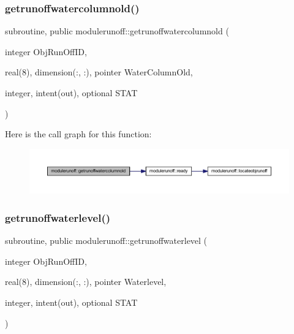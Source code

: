 \subsubsection{\texorpdfstring{getrunoffwatercolumnold()}{getrunoffwatercolumnold()}}
{\footnotesize\ttfamily subroutine, public modulerunoff\+::getrunoffwatercolumnold (\begin{DoxyParamCaption}\item[{integer}]{Obj\+Run\+Off\+ID,  }\item[{real(8), dimension(\+:, \+:), pointer}]{Water\+Column\+Old,  }\item[{integer, intent(out), optional}]{S\+T\+AT }\end{DoxyParamCaption})}

Here is the call graph for this function\+:
\nopagebreak
\begin{figure}[H]
\begin{center}
\leavevmode
\includegraphics[width=350pt]{namespacemodulerunoff_a4718c4b469bb2480c20b88afa22ebc29_cgraph}
\end{center}
\end{figure}
\mbox{\label{namespacemodulerunoff_a739d861fb3d51996841a644f1567506e}} 
\subsubsection{\texorpdfstring{getrunoffwaterlevel()}{getrunoffwaterlevel()}}
{\footnotesize\ttfamily subroutine, public modulerunoff\+::getrunoffwaterlevel (\begin{DoxyParamCaption}\item[{integer}]{Obj\+Run\+Off\+ID,  }\item[{real(8), dimension(\+:, \+:), pointer}]{Waterlevel,  }\item[{integer, intent(out), optional}]{S\+T\+AT }\end{DoxyParamCaption})}

